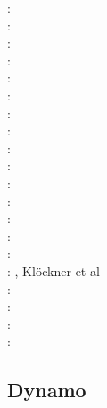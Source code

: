 \begin{scriptsize}
\nineteenseventythree: \cite{rehi73}\\
\nineteenninetyseven: \cite{bare97}\\
\nineteenninetyeight: \cite{cosh98}\\
\nineteenninetynine: \cite{riwg99}\\
\twothousand: \cite{coks00}\cite{brmm00}\cite{cacp00}\\
\twothousandtwo: \cite{cacp02}\cite{coks02}\cite{arbc02}\cite{gurw02}\\
\twothousandthree: \cite{cock03}\\
\twothousandfour: \cite{coks04}\\
\twothousandfive: \cite{cacs05}\cite{coks05}\cite{cogo05a}\cite{cogo05b}\cite{cogo05c}\\
\twothousandseven: \cite{coks07}\cite{feku07}\\
\twothousandeight: \cite{kans08}\cite{mofh08}\cite{dole08}\cite{pepe08}\\
\twothousandnine: \cite{coks09}\cite{cogo09}\cite{cogl09}\cite{ngpc09}\cite{shu09}\cite{codg08}\cite{cogw09}\\
\twothousandten: \cite{ngpc10}\cite{conp10}\cite{mofp10}\cite{kari10}\cite{cogs10}\\
\twothousandeleven: \cite{geor11}\cite{ngpc11}\\
\twothousandtwelve: \cite{kauf12}\cite{ngpe12}\cite[chapt. 31]{lomw12}\\
\twothousandthirteen: \cite{vyrc13}\cite{rhcv13}, Kl\"ockner et al \cite{klwh13}\\
\twothousandfifteen: \cite{lelk15}\cite{kalc15}\\
\twothousandsixteen: \cite{cock16}\cite{makc16}\\
\twothousandseventeen: \cite{fewk17}\cite{iglo17}\cite{hepb17}\cite{chll17}\cite{sclu17a}\cite{sclu17b}
      \cite{sclu17c}\cite{zhan17}\\
\twothousandeighteen: \cite{puth18}\cite{wogu18}\cite{fakr18}\cite{muwy18}
\end{scriptsize}

\subsection{Dynamo}

